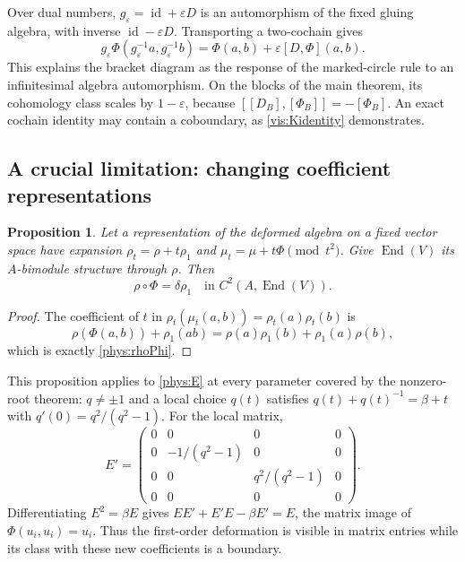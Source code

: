 \documentclass[a4paper,11pt,oneside,reqno]{amsart}
\newtheorem{proposition}[theorem]{Proposition}
\theoremstyle{definition}
\numberwithin{equation}{section}
\begin{document}
Over dual numbers, $g_\varepsilon=\operatorname{id}+\varepsilon D$
is an automorphism of the fixed gluing algebra, with inverse
$\operatorname{id}-\varepsilon D$. Transporting a two-cochain gives
\begin{equation}\label{phys:transport-Phi}
 g_\varepsilon\Phi(g_\varepsilon^{-1}a,g_\varepsilon^{-1}b)
 =\Phi(a,b)+\varepsilon[D,\Phi](a,b).
\end{equation}
This explains the bracket diagram as the response of the marked-circle
rule to an infinitesimal algebra automorphism. On the blocks of the main
theorem, its cohomology class scales by $1-\varepsilon$, because
$[[D_B],[\Phi_B]]=-[\Phi_B]$. An exact cochain identity may contain a
coboundary, as \eqref{vis:Kidentity} demonstrates.

\subsection{A crucial limitation: changing coefficient representations}
\begin{proposition}\label{phys:rho-boundary}
Let a representation of the deformed algebra on a fixed vector space
have expansion $\rho_t=\rho+t\rho_1$ and
$\mu_t=\mu+t\Phi\pmod{t^2}$. Give $\operatorname{End}(V)$ its
$A$-bimodule structure through $\rho$. Then
\begin{equation}\label{phys:rhoPhi}
 \boxed{\rho\circ\Phi=\delta\rho_1
 \quad\text{in }C^2(A,\operatorname{End}(V)).}
\end{equation}
\end{proposition}
\begin{proof}
The coefficient of $t$ in
$\rho_t(\mu_t(a,b))=\rho_t(a)\rho_t(b)$ is
\[
 \rho(\Phi(a,b))+\rho_1(ab)
 =\rho(a)\rho_1(b)+\rho_1(a)\rho(b),
\]
which is exactly \eqref{phys:rhoPhi}.
\end{proof}
This proposition applies to \eqref{phys:E} at every parameter covered by
the nonzero-root theorem: $q\ne\pm1$ and a local choice $q(t)$ satisfies
$q(t)+q(t)^{-1}=\beta+t$ with $q'(0)=q^2/(q^2-1)$. For the local matrix,
\[
 E'=\begin{pmatrix}
 0&0&0&0\\0&-1/(q^2-1)&0&0\\
 0&0&q^2/(q^2-1)&0\\0&0&0&0
 \end{pmatrix}.
\]
Differentiating $E^2=\beta E$ gives
$EE'+E'E-\beta E'=E$, the matrix image of
$\Phi(u_i,u_i)=u_i$. Thus the first-order deformation is visible in
matrix entries while its class with these new coefficients is a boundary.
\end{document}
